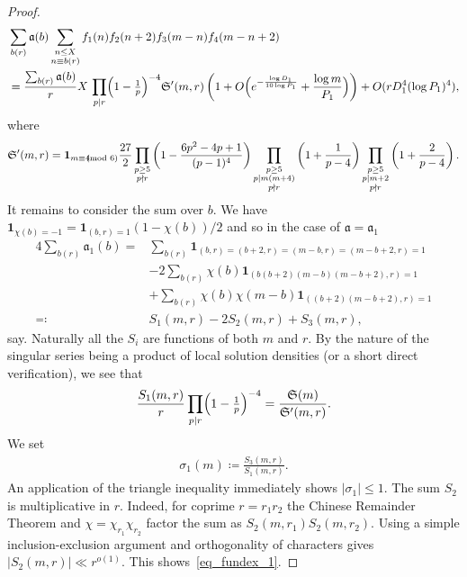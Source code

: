 \documentclass[12pt]{amsart}
\theoremstyle{definition}
\theoremstyle{remark}
\numberwithin{equation}{section}
\newcommand{\1}{\mathbf{1}}
\let\oldpmod\pmod
\renewcommand{\pmod}[1]{\hspace{-0.12cm}\oldpmod {#1}}
\begin{document}
\begin{proof}
\begin{align*}
		&\sum_{b(r)}\mathfrak{a}(b)\sum_{\substack{n\leq X \\ n\equiv b(r)}} f_1(n)f_2(n+2)f_3(m-n)f_4(m-n+2)\\
		&=\frac{\sum_{b(r)}\mathfrak{a}(b)}{r}X \,\prod_{p\mid r}\Bigl(1-\tfrac1p\Bigr)^{-4}\mathfrak{S}'(m,r)\left(1+O\Bigl(e^{- \frac{\log D_1}{10 \log P_1}}+\frac{\log m}{P_1}\Bigr) \right) +O(rD_1^4(\log P_1)^4),
	\end{align*}
	where
	\begin{align*}
        \mathfrak{S}'(m,r)=\1_{m\equiv 4\pmod 6}\frac{27}{2}\prod_{\substack{p\geq 5\\ p\nmid r}}\left(1-\frac{6p^2-4p+1}{(p-1)^4}\right)\prod_{\substack{p\geq 5\\ p\mid m(m+4)\\ p\nmid r}}\left(1+\frac{1}{p-4}\right)\prod_{\substack{p\geq 5\\ p\mid m+2\\ p\nmid r}}\left(1+\frac{2}{p-4}\right).
	\end{align*}
	It remains to consider the sum over $b$. We have $\1_{\chi(b)=-1}=\1_{(b,r)=1}(1-\chi(b))/2$ and so in the case of $\mathfrak{a}=\mathfrak{a}_1$
	\begin{align*}
		4\sum_{b(r)}\mathfrak{a}_1(b)=&\sum_{b(r)}\1_{(b,r)=(b+2,r)=(m-b,r)=(m-b+2,r)=1}\\
		&-2 \sum_{b(r)}\chi(b)\1_{(b(b+2)(m-b)(m-b+2),r)=1}\\
		&+\sum_{b(r)}\chi(b)\chi(m-b)\1_{((b+2)(m-b+2),r)=1}\\
		\eqqcolon &S_1(m,r)-2S_2(m,r)+S_3(m,r),
	\end{align*}
    say. Naturally all the $S_i$ are functions of both $m$ and $r$. By the nature of the singular series being a product of local solution densities (or a short direct verification), we see that 
	\begin{align*}
		\frac{S_1(m,r)}{r}\prod_{p\mid r}\Bigl(1-\tfrac1p\Bigr)^{-4}=\frac{\mathfrak{S}(m)}{\mathfrak{S}'(m,r)}.
	\end{align*}
	We set
	\begin{align*}
		\sigma_1(m)\coloneqq\frac{S_3(m,r)}{S_1(m,r)}.
	\end{align*}
	An application of the triangle inequality immediately shows $|\sigma_1|\leq 1$. The sum $S_2$ is multiplicative in $r$. Indeed, for coprime $r=r_1r_2$ the Chinese Remainder Theorem and $\chi=\chi_{r_1}\chi_{r_2}$ factor the sum as $S_2(m,r_1)S_2(m,r_2)$. Using a simple inclusion-exclusion argument and orthogonality of characters gives $|S_2(m,r)|\ll r^{o(1)}.$ This shows~\eqref{eq_fundex_1}.
	

\end{proof}
\end{document}

